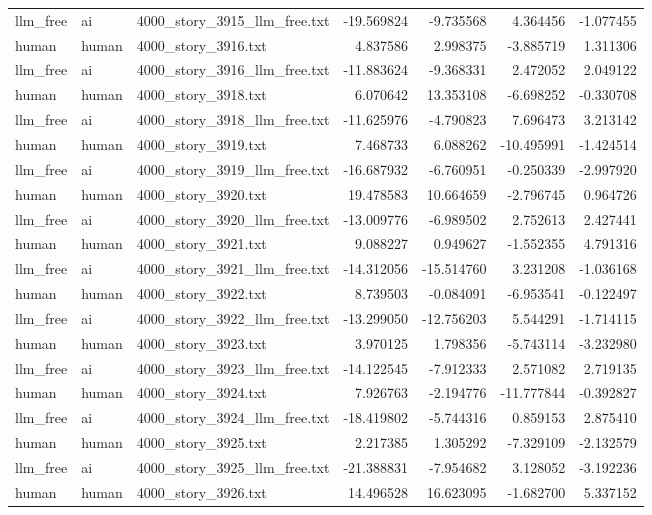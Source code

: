 \begin{longtable}{lllrrrr}
llm\_free & ai & 4000\_story\_3915\_llm\_free.txt & -19.569824 & -9.735568 & 4.364456 & -1.077455 \\
human & human & 4000\_story\_3916.txt & 4.837586 & 2.998375 & -3.885719 & 1.311306 \\
llm\_free & ai & 4000\_story\_3916\_llm\_free.txt & -11.883624 & -9.368331 & 2.472052 & 2.049122 \\
human & human & 4000\_story\_3918.txt & 6.070642 & 13.353108 & -6.698252 & -0.330708 \\
llm\_free & ai & 4000\_story\_3918\_llm\_free.txt & -11.625976 & -4.790823 & 7.696473 & 3.213142 \\
human & human & 4000\_story\_3919.txt & 7.468733 & 6.088262 & -10.495991 & -1.424514 \\
llm\_free & ai & 4000\_story\_3919\_llm\_free.txt & -16.687932 & -6.760951 & -0.250339 & -2.997920 \\
human & human & 4000\_story\_3920.txt & 19.478583 & 10.664659 & -2.796745 & 0.964726 \\
llm\_free & ai & 4000\_story\_3920\_llm\_free.txt & -13.009776 & -6.989502 & 2.752613 & 2.427441 \\
human & human & 4000\_story\_3921.txt & 9.088227 & 0.949627 & -1.552355 & 4.791316 \\
llm\_free & ai & 4000\_story\_3921\_llm\_free.txt & -14.312056 & -15.514760 & 3.231208 & -1.036168 \\
human & human & 4000\_story\_3922.txt & 8.739503 & -0.084091 & -6.953541 & -0.122497 \\
llm\_free & ai & 4000\_story\_3922\_llm\_free.txt & -13.299050 & -12.756203 & 5.544291 & -1.714115 \\
human & human & 4000\_story\_3923.txt & 3.970125 & 1.798356 & -5.743114 & -3.232980 \\
llm\_free & ai & 4000\_story\_3923\_llm\_free.txt & -14.122545 & -7.912333 & 2.571082 & 2.719135 \\
human & human & 4000\_story\_3924.txt & 7.926763 & -2.194776 & -11.777844 & -0.392827 \\
llm\_free & ai & 4000\_story\_3924\_llm\_free.txt & -18.419802 & -5.744316 & 0.859153 & 2.875410 \\
human & human & 4000\_story\_3925.txt & 2.217385 & 1.305292 & -7.329109 & -2.132579 \\
llm\_free & ai & 4000\_story\_3925\_llm\_free.txt & -21.388831 & -7.954682 & 3.128052 & -3.192236 \\
human & human & 4000\_story\_3926.txt & 14.496528 & 16.623095 & -1.682700 & 5.337152 \\

\end{longtable}
